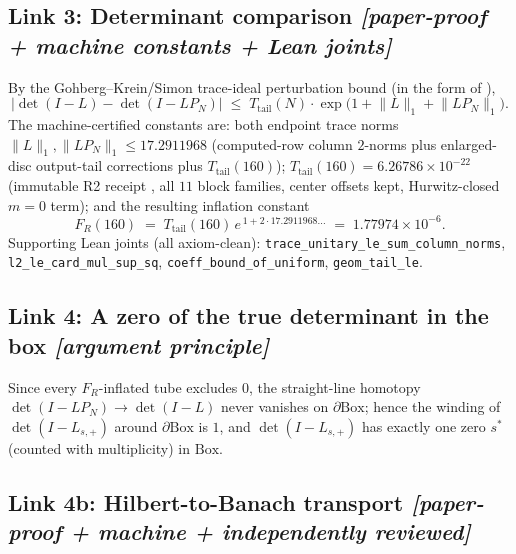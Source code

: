 \documentclass[11pt]{article}
\theoremstyle{definition}
\theoremstyle{remark}
\newcommand{\norm}[1]{\lVert #1 \rVert}
\begin{document}
\subsection*{Link 3: Determinant comparison
\emph{[paper-proof + machine constants + Lean joints]}}

By the Gohberg--Krein/Simon trace-ideal perturbation bound (in the form
of \cite{SimonTraceIdeals}),
\[
\bigl| \det(I - L) - \det(I - L P_N) \bigr|
\;\le\;
T_{\mathrm{tail}}(N)\cdot
\exp\bigl(1 + \norm{L}_1 + \norm{L P_N}_1\bigr).
\]
The machine-certified constants \cite{R3bReceipt} are: both endpoint
trace norms $\norm{L}_1, \norm{L P_N}_1 \le 17.2911968$ (computed-row
column $2$-norms plus enlarged-disc output-tail corrections plus
$T_{\mathrm{tail}}(160)$); $T_{\mathrm{tail}}(160) = 6.26786\times
10^{-22}$ (immutable R2 receipt \cite{R2Receipt}, all $11$ block
families, center offsets kept, Hurwitz-closed $m=0$ term); and the
resulting inflation constant
\[
F_R(160) \;=\; T_{\mathrm{tail}}(160)\,
e^{\,1 + 2\cdot 17.2911968\ldots} \;=\; 1.77974\times 10^{-6}.
\]
Supporting Lean joints \cite{LeanV18,LeanV19} (all axiom-clean):
\texttt{trace\_unitary\_le\_sum\_column\_norms},
\texttt{l2\_le\_card\_mul\_sup\_sq},
\texttt{coeff\_bound\_of\_uniform}, \texttt{geom\_tail\_le}.

\subsection*{Link 4: A zero of the true determinant in the box
\emph{[argument principle]}}

Since every $F_R$-inflated tube excludes $0$, the straight-line
homotopy $\det(I - L P_N) \to \det(I - L)$ never vanishes on
$\partial\mathrm{Box}$; hence the winding of $\det(I - L_{s,+})$ around
$\partial\mathrm{Box}$ is $1$, and $\det(I - L_{s,+})$ has exactly one
zero $s^*$ (counted with multiplicity) in $\mathrm{Box}$.

\subsection*{Link 4b: Hilbert-to-Banach transport
\emph{[paper-proof + machine + independently reviewed]}}
\end{document}
